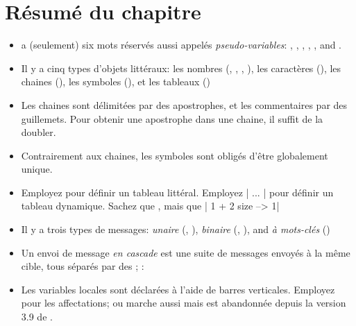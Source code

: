 \documentclass[a4paper,10pt,twoside]{book}
\begin{document}

\section{R\'{e}sum\'{e} du chapitre}

\begin{itemize}

\item	\sq a (seulement) six mots r\'{e}serv\'{e}s aussi appel\'{e}s \textit{pseudo-variables}: , , , , ,  and  .

\item	Il y a cinq types d'objets litt\'{e}raux: les nombres (, , , ), les caract\`{e}res (), les chaines (), les symboles (), et les tableaux ()

\item	Les chaines sont d\'{e}limit\'{e}es par des apostrophes, et les commentaires par des guillemets. Pour obtenir une apostrophe dans une chaine, il suffit de la doubler.


\item	Contrairement aux chaines, les symboles sont oblig\'{e}s d'\^{e}tre globalement unique.

\item	Employez  pour d\'{e}finir un tableau litt\'{e}ral.
		Employez \ct|{ ... }| pour d\'{e}finir un tableau dynamique.
		Sachez que
		, mais que 
		\ct|{ 1 + 2 } size --> 1|

\item	Il y a trois types de messages:
		\emph{unaire} (\eg {}, ),
		\emph{binaire} (\eg {}, ), and
		\emph{\`{a} mots-cl\'{e}s} (\eg {})

\item	Un envoi de message \emph{en cascade}  est une suite de messages envoy\'{e}s \`{a} la m\^{e}me cible, tous s\'{e}par\'{e}s par des ; :

\item	Les variables locales sont d\'{e}clar\'{e}es à l'aide de barres verticales.
		Employez \ct{:=} pour les affectations; \ct{_} ou  marche aussi mais est abandonnée depuis la version 3.9 de \sq .


\end{itemize}
\end{document}
